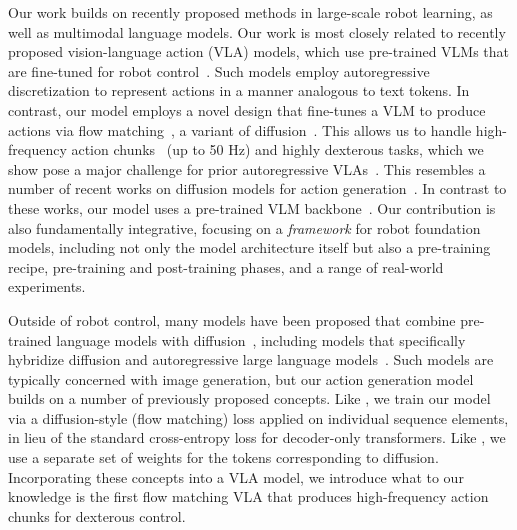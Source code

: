 Our work builds on recently proposed methods in large-scale robot learning, as well as multimodal language models. Our work is most closely related to recently proposed vision-language action (VLA) models, which use pre-trained VLMs that are fine-tuned for robot control~\citep{brohan2023rt2visionlanguageactionmodelstransfer, kim2024openvla, wen2024tinyvlafastdataefficientvisionlanguageaction}. Such models employ autoregressive discretization to represent actions in a manner analogous to text tokens. In contrast, our model employs a novel design that fine-tunes a VLM to produce actions via flow matching~\citep{liu2022rectified, lipman2022flow}, a variant of diffusion~\citep{ho2020denoisingdiffusionprobabilisticmodels, sohldickstein2015deepunsupervisedlearningusing}. This allows us to handle high-frequency action chunks~\citep{zhao2023learning} (up to 50 Hz) and highly dexterous tasks, which we show pose a major challenge for prior autoregressive VLAs~\citep{brohan2023rt2visionlanguageactionmodelstransfer}. This resembles a number of recent works on diffusion models for action generation~\citep{chi2023diffusion, zhu2024scalingdiffusionpolicytransformer}. In contrast to these works, our model uses a pre-trained VLM backbone~\citep{beyer2024paligemma}. Our contribution is also fundamentally integrative, focusing on a \emph{framework} for robot foundation models, including not only the model architecture itself but also a pre-training recipe, pre-training and post-training phases, and a range of real-world experiments.

Outside of robot control, many models have been proposed that combine pre-trained language models with diffusion~\citep{rombach2022high, saharia2022photorealistic, esser2024scaling}, including models that specifically hybridize diffusion and autoregressive large language models~\citep{he2024mars, liu2024playground, zhou2024transfusion}. Such models are typically concerned with image generation, but our action generation model builds on a number of previously proposed concepts. Like \citet{zhou2024transfusion}, we train our model via a diffusion-style (flow matching) loss applied on individual sequence elements, in lieu of the standard cross-entropy loss for decoder-only transformers. Like \citet{liu2024playground}, we use a separate set of weights for the tokens corresponding to diffusion. Incorporating these concepts into a VLA model, we introduce what to our knowledge is the first flow matching VLA that produces high-frequency action chunks for dexterous control.

